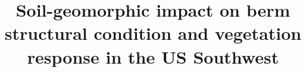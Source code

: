 \documentclass[review]{elsarticle}
\begin{document}
\begin{frontmatter}

\title{Soil-geomorphic impact on berm structural condition and vegetation response in the US Southwest}






\linenumbers


\end{frontmatter}
\end{document}
